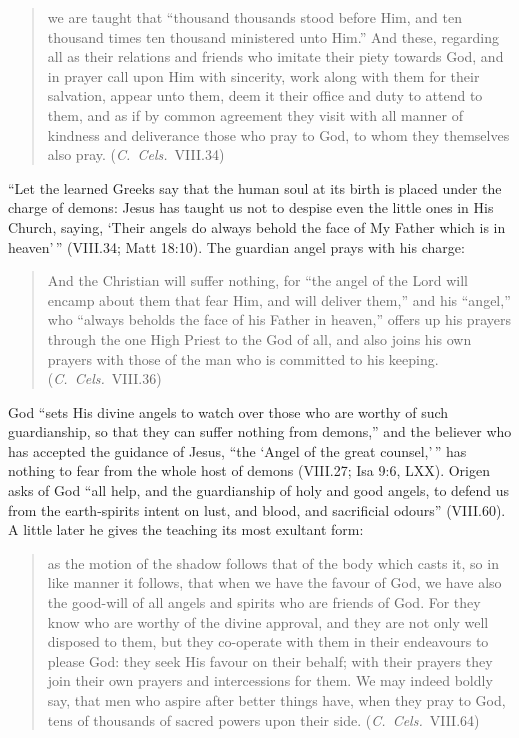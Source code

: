 \begin{quote}
we are taught that ``thousand thousands stood before Him, and ten
thousand times ten thousand ministered unto Him.'' And these, regarding
all as their relations and friends who imitate their piety towards God,
and in prayer call upon Him with sincerity, work along with them for their
salvation, appear unto them, deem it their office and duty to attend to
them, and as if by common agreement they visit with all manner of kindness
and deliverance those who pray to God, to whom they themselves also pray.
(\emph{C.\ Cels.}\ VIII.34)
\end{quote}

\noindent ``Let the learned Greeks say that the human soul at its birth is
placed under the charge of demons: Jesus has taught us not to despise even
the little ones in His Church, saying, `Their angels do always behold the
face of My Father which is in heaven'\,'' (VIII.34; Matt 18:10). The
guardian angel prays with his charge:

\begin{quote}
And the Christian will suffer nothing, for ``the angel of the Lord will
encamp about them that fear Him, and will deliver them,'' and his
``angel,'' who ``always beholds the face of his Father in heaven,'' offers
up his prayers through the one High Priest to the God of all, and also
joins his own prayers with those of the man who is committed to his
keeping. (\emph{C.\ Cels.}\ VIII.36)
\end{quote}

\noindent God ``sets His divine angels to watch over those who are worthy of
such guardianship, so that they can suffer nothing from demons,'' and the
believer who has accepted the guidance of Jesus, ``the `Angel of the great
counsel,'\,'' has nothing to fear from the whole host of demons (VIII.27;
Isa 9:6, LXX). Origen asks of God ``all help, and the guardianship of holy
and good angels, to defend us from the earth-spirits intent on lust, and
blood, and sacrificial odours'' (VIII.60). A little later he gives the teaching its most exultant form:

\begin{quote}
as the motion of the shadow follows that of the body which casts it, so
in like manner it follows, that when we have the favour of God, we have
also the good-will of all angels and spirits who are friends of God. For
they know who are worthy of the divine approval, and they are not only
well disposed to them, but they co-operate with them in their endeavours
to please God: they seek His favour on their behalf; with their prayers
they join their own prayers and intercessions for them. We may indeed
boldly say, that men who aspire after better things have, when they pray
to God, tens of thousands of sacred powers upon their side. (\emph{C.\
Cels.}\ VIII.64)
\end{quote}

